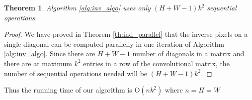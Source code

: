 \documentclass[a4paper,twoside]{article}
\newtheorem{theorem}{Theorem}
\theoremstyle{definition}
\begin{document}
\begin{theorem}
Algorithm \ref{alg:inv_algo} uses only $(H+W-1)k^2$ sequential operations.
\end{theorem}

\begin{proof}
We have proved in Theorem \ref{th:ind_parallel} that the inverse pixels on a single diagonal can be computed parallelly in one iteration of Algorithm \ref{alg:inv_algo}. Since there are $H + W - 1$ number of diagonals in a matrix and there are at maximum $k^2$ entries in a row of the convolutional matrix, the number of sequential operations needed will be $(H+W-1)k^2$.
\end{proof}

Thus the running time of our algorithm is O$(n k^2)$ where $n = H = W$ 

\begin{table*}[!t]
\caption{Comparison of the  bits per dimension (BPD), forward pass time (FT) and sampling time (ST) on standard benchmark datasets of various $k \times k$ convolution based Normalizing Flow models. FT and ST are presented in seconds.}
\centering

    \label{table:bpd_table}
\end{table*}
\end{document}
